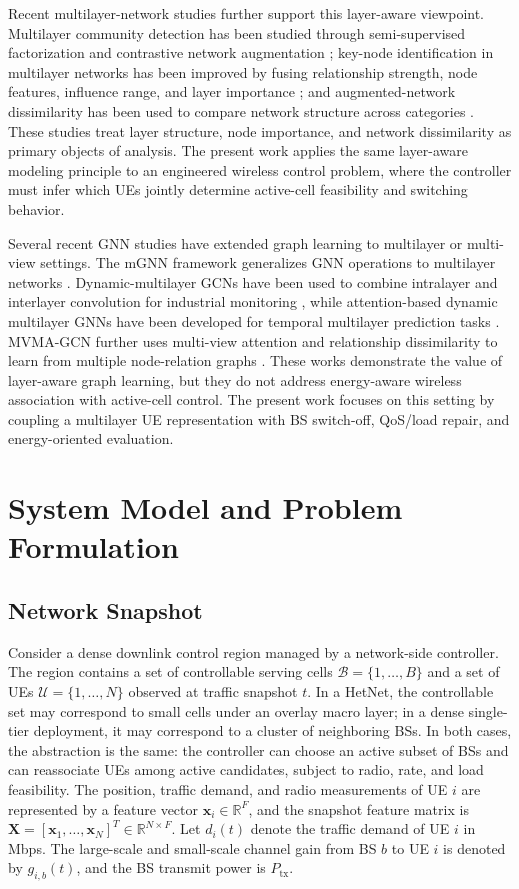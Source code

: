 \documentclass[journal]{IEEEtran}
\begin{document}
Recent multilayer-network studies further support this layer-aware viewpoint.
Multilayer community detection has been studied through semi-supervised
factorization and contrastive network augmentation
\cite{lv2023community,teng2025contrastive}; key-node identification in
multilayer networks has been improved by fusing relationship strength, node
features, influence range, and layer importance
\cite{basaras2019influential,an2026keynodes}; and augmented-network
dissimilarity has been used to compare network structure across categories
\cite{zhang2026dissimilarity}. These studies treat layer structure, node
importance, and network dissimilarity as primary objects of analysis. The
present work applies the same layer-aware modeling principle to an engineered
wireless control problem, where the controller must infer which UEs jointly
determine active-cell feasibility and switching behavior.

Several recent GNN studies have extended graph learning to multilayer or
multi-view settings. The mGNN framework generalizes GNN operations to
multilayer networks \cite{grassia2021mgnn}. Dynamic-multilayer GCNs have been
used to combine intralayer and interlayer convolution for industrial monitoring
\cite{zhang2023dynamic}, while attention-based dynamic multilayer GNNs have
been developed for temporal multilayer prediction tasks
\cite{zandi2025attention}. MVMA-GCN further uses multi-view attention and
relationship dissimilarity to learn from multiple node-relation graphs
\cite{zhang2023mvma}. These works demonstrate the value of layer-aware graph
learning, but they do not address energy-aware wireless association with
active-cell control. The present work focuses on this setting by coupling a
multilayer UE representation with BS switch-off, QoS/load repair, and
energy-oriented evaluation.

\section{System Model and Problem Formulation}
\subsection{Network Snapshot}
Consider a dense downlink control region managed by a network-side controller.
The region contains a set of controllable serving cells
$\mathcal{B}=\{1,\ldots,B\}$ and a set of UEs
$\mathcal{U}=\{1,\ldots,N\}$ observed at traffic snapshot $t$. In a HetNet, the
controllable set may correspond to small cells under an overlay macro layer; in
a dense single-tier deployment, it may correspond to a cluster of neighboring
BSs. In both cases, the abstraction is the same: the controller can choose an
active subset of BSs and can reassociate UEs among active candidates, subject to
radio, rate, and load feasibility. The position, traffic demand, and radio
measurements of UE $i$ are represented by a feature vector
$\mathbf{x}_i\in\mathbb{R}^{F}$, and the snapshot feature matrix is
$\mathbf{X}=[\mathbf{x}_1,\ldots,\mathbf{x}_N]^{T}\in\mathbb{R}^{N\times F}$.
Let $d_i(t)$ denote the traffic demand of UE $i$ in Mbps. The large-scale and
small-scale channel gain from BS $b$ to UE $i$ is denoted by $g_{i,b}(t)$, and
the BS transmit power is $P_{\mathrm{tx}}$.
\end{document}
